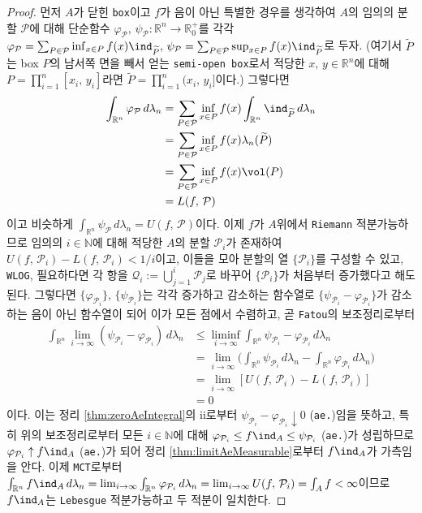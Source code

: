 \begin{proof}
    먼저 $A$가 닫힌 \texttt{box}이고 $f$가 음이 아닌 특별한 경우를 생각하여 $A$의 임의의 분할 $\mathcal{P}$에 대해 단순함수 $\varphi_\mathcal{P},\,\psi_\mathcal{P}:\mathbb{R}^n\to\mathbb{R}^+_0$를 각각 $\varphi_\mathcal{P}=\sum_{P\in\mathcal{P}}\inf_{x\in P}f(x)\ind_{\widetilde{P}},\,\psi_\mathcal{P}=\sum_{P\in\mathcal{P}}\sup_{x\in P}f(x)\ind_{\widetilde{P}}$로 두자. (여기서 $\widetilde{P}$는 box $P$의 남서쪽 면을 빼서 얻는 \texttt{semi-open box}로서 적당한 $x,\,y\in\mathbb{R}^n$에 대해 $P=\prod_{i=1}^n[x_i,\,y_i]$라면 $\widetilde{P}=\prod_{i=1}^n(x_i,\,y_i]$이다.) 그렇다면
    \begin{align*}
        \int_{\mathbb{R}^n}\varphi_\mathcal{P}\,d\lambda_n&=\sum_{P\in\mathcal{P}}\inf_{x\in P}f(x)\int_{\mathbb{R}^n}\ind_{\widetilde{P}}\,d\lambda_n\\
        &=\sum_{P\in\mathcal{P}}\inf_{x\in P}f(x)\lambda_n(\widetilde{P})\\
        &=\sum_{P\in\mathcal{P}}\inf_{x\in P}f(x)\vol(P)\\
        &=L(f,\,\mathcal{P})
    \end{align*}
    이고 비슷하게 $\int_{\mathbb{R}^n}\psi_\mathcal{P}\,d\lambda_n=U(f,\,\mathcal{P})$이다. 이제 $f$가 $A$위에서 \texttt{Riemann} 적분가능하므로 임의의 $i\in\mathbb{N}$에 대해 적당한 $A$의 분할 $\mathcal{P}_i$가 존재하여 $U(f,\,\mathcal{P}_i)-L(f,\,\mathcal{P}_i)<1/i$이고, 이들을 모아 분할의 열 $\{\mathcal{P}_i\}$를 구성할 수 있고, \texttt{WLOG}, 필요하다면 각 항을 $\mathcal{Q}_i:=\bigcup_{j=1}^i\mathcal{P}_j$로 바꾸어 $\{\mathcal{P}_i\}$가 처음부터 증가했다고 해도 된다. 그렇다면 $\{\varphi_{\mathcal{P}_i}\},\,\{\psi_{\mathcal{P}_i}\}$는 각각 증가하고 감소하는 함수열로 $\{\psi_{\mathcal{P}_i}-\varphi_{\mathcal{P}_i}\}$가 감소하는 음이 아닌 함수열이 되어 이가 모든 점에서 수렴하고, 곧 \texttt{Fatou}의 보조정리로부터
    \begin{align*}
        \int_{\mathbb{R}^n}\lim_{i\to\infty}(\psi_{\mathcal{P}_i}-\varphi_{\mathcal{P}_i})\,d\lambda_n&\leq\liminf_{i\to\infty}\int_{\mathbb{R}^n}\psi_{\mathcal{P}_i}-\varphi_{\mathcal{P}_i}\,d\lambda_n\\
        &=\lim_{i\to\infty}\bigg(\int_{\mathbb{R}^n}\psi_{\mathcal{P}_i}\,d\lambda_n-\int_{\mathbb{R}^n}\varphi_{\mathcal{P}_i}\,d\lambda_n\bigg)\\
        &=\lim_{i\to\infty}[U(f,\,\mathcal{P}_i)-L(f,\,\mathcal{P}_i)]\\
        &=0
    \end{align*}
    이다. 이는 정리 \ref{thm:zeroAeIntegral}의 ii로부터 $\psi_{\mathcal{P}_i}-\varphi_{\mathcal{P}_i}\downarrow0$ (\texttt{ae.})임을 뜻하고, 특히 위의 보조정리로부터 모든 $i\in\mathbb{N}$에 대해 $\varphi_{\mathcal{P}_i}\leq f\ind_A\leq\psi_{\mathcal{P}_i}$ (\texttt{ae.})가 성립하므로\footnotemark $\varphi_{\mathcal{P}_i}\uparrow f\ind_A$ (\texttt{ae.})가 되어 정리 \ref{thm:limitAeMeasurable}로부터 $f\ind_A$가 가측임을 안다. 이제 \texttt{MCT}로부터 $\int_{\mathbb{R}^n}f\ind_A\,d\lambda_n=\lim_{i\to\infty}\int_{\mathbb{R}^n}\varphi_{\mathcal{P}_i}\,d\lambda_n=\lim_{i\to\infty} U(f,\,\mathcal{P}_i)=\int_Af<\infty$이므로 $f\ind_A$는 \texttt{Lebesgue} 적분가능하고 두 적분이 일치한다.


\end{proof}
